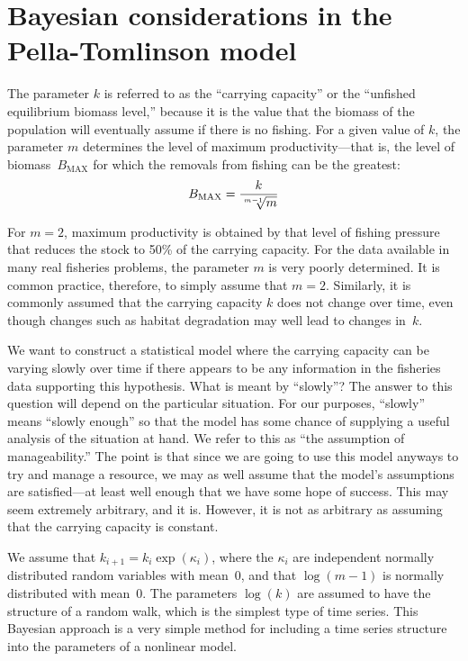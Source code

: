 \documentclass{admbmanual}
\newcommand\bmax{B_{\textrm{MAX}}}
\begin{document}
\section{Bayesian considerations in the Pella-Tomlinson model}

The parameter $k$ is referred to as the ``carrying capacity'' or the ``unfished
equilibrium biomass level,'' because it is the value that the biomass of the
population will eventually assume if there is no fishing. For a given value of
$k$, the parameter $m$ determines the level of maximum productivity---that is,
the level of biomass~$\bmax$ for which the removals from fishing can be the
greatest:
$$\bmax=\frac{k}{\root {m-1} \of m}$$

For $m=2$, maximum productivity is obtained by that level of fishing pressure
that reduces the stock to 50\% of the carrying capacity. For the data available
in many real fisheries problems, the parameter $m$ is very poorly determined. It
is common practice, therefore, to simply assume that $m=2$. Similarly, it is
commonly assumed that the carrying capacity $k$ does not change over time, even
though changes such as habitat degradation may well lead to changes in~$k$.

We want to construct a statistical model where the carrying capacity can be
varying slowly over time if there appears to be any information in the fisheries
data supporting this hypothesis. What is meant by ``slowly''? The answer to this
question will depend on the particular situation. For our purposes, ``slowly''
means ``slowly enough'' so that the model has some chance of supplying a useful
analysis of the situation at hand. We refer to this as ``the assumption of
manageability.'' The point is that since we are going to use this model anyways
to try and manage a resource, we may as well assume that the model's assumptions
are satisfied---at least well enough that we have some hope of success. This may
seem extremely arbitrary, and it is. However, it is not as arbitrary as assuming
that the carrying capacity is constant.

We assume that $k_{i+1}=k_i \exp(\kappa_i)$, where the $\kappa_i$ are
independent normally distributed random variables with mean~0, and that
$\log(m-1)$ is normally distributed with mean~0. The parameters $\log(k)$ are
assumed to have the structure of a random walk, which is the simplest type of
time series. This Bayesian approach is a very simple method for including a time
series structure into the parameters of a nonlinear model.
\end{document}
